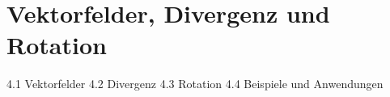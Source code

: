 \chapter{Vektorfelder, Divergenz und Rotation}

4.1 Vektorfelder
4.2 Divergenz
4.3 Rotation
4.4 Beispiele und Anwendungen